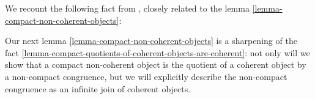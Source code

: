 We recount the following fact from \cite{johnstone-topos-theory}, closely related to the lemma \ref{lemma-compact-non-coherent-objects}:

Our next lemma \ref{lemma-compact-non-coherent-objects} is a sharpening of the fact \ref{lemma-compact-quotients-of-coherent-objects-are-coherent}: not only will we show that a compact non-coherent object is the quotient of a coherent object by a non-compact congruence, but we will explicitly describe the non-compact congruence as an infinite join of coherent objects.

